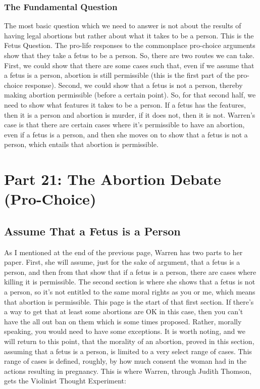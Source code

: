 \subsection{The Fundamental Question}

The most basic question which we need to answer is not about the results of having legal abortions but rather about what it takes to be a person. This is the Fetus Question. The pro-life responses to the commonplace pro-choice arguments show that they take a fetus to be a person. So, there are two routes we can take. First, we could show that there are some cases such that, even if we assume that a fetus is a person, abortion is still permissible (this is the first part of the pro-choice response). Second, we could show that a fetus is not a person, thereby making abortion permissible (before a certain point). So, for that second half, we need to show what features it takes to be a person. If a fetus has the features, then it is a person and abortion is murder, if it does not, then it is not. Warren's case is that there are certain cases where it's permissible to have an abortion, even if a fetus is a person, and then she moves on to show that a fetus is not a person, which entails that abortion is permissible.

\chapter{Part 21: The Abortion Debate (Pro-Choice)}
\section{Assume That a Fetus is a Person}
As I mentioned at the end of the previous page, Warren has two parts to her paper. First, she will assume, just for the sake of argument, that a fetus is a person, and then from that show that if a fetus is a person, there are cases where killing it is permissible. The second section is where she shows that a fetus is not a person, so it's not entitled to the same moral rights as you or me, which means that abortion is permissible. This page is the start of that first section. If there's a way to get that at least some abortions are OK in this case, then you can't have the all out ban on them which is some times proposed. Rather, morally speaking, you would need to have some exceptions. It is worth noting, and we will return to this point, that the morality of an abortion, proved in this section, assuming that a fetus is a person, is limited to a very select range of cases. This range of cases is defined, roughly, by how much consent the woman had in the actions resulting in pregnancy.  This is where Warren, through Judith Thomson, gets the Violinist Thought Experiment:\autocite{Thomson1}

